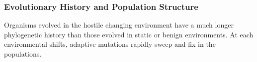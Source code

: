 \subsubsection{Evolutionary History and Population Structure}

Organisms evolved in the hostile changing environment have a much longer phylogenetic history than those evolved in static or benign environments. At each environmental shifts, adaptive mutations rapidly sweep and fix in the populations.




